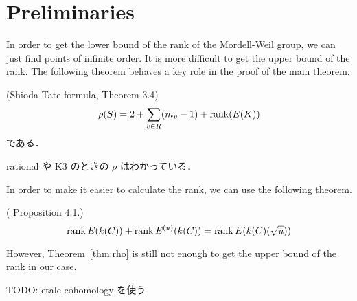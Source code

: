\documentclass[main]{subfiles}
\begin{document}
\chapter{Preliminaries}

In order to get the lower bound of the rank of the Mordell-Weil group, we can just find points of infinite order.
It is more difficult to get the upper bound of the rank.
The following theorem behaves a key role in the proof of the main theorem.
\begin{thm}{(Shioda-Tate formula, \cite{ref:naskrecki2013} Theorem 3.4)}
    \label{thm:shioda}
    \begin{equation}
        \rho (S) = 2 + \sum_{v \in R} (m_{v} - 1) + \operatorname{rank}(E(K))
    \end{equation}
    である．
\end{thm}

\begin{thm}
    \label{thm:rho}
    rational や K3 のときの $\rho$ はわかっている．
\end{thm}

In order to make it easier to calculate the rank, we can use the following theorem.

\begin{thm}{(\cite{ref:naskrecki2013} Proposition 4.1.)}
    \begin{equation}
        \operatorname{rank} E(k(C)) + \operatorname{rank} E^{(u)}(k(C)) = \operatorname{rank} E(k(C)(\sqrt{u}))
    \end{equation}
\end{thm}

However, Theorem~\ref{thm:rho} is still not enough to get the upper bound of the rank in our case.

TODO: etale cohomology を使う
\end{document}
